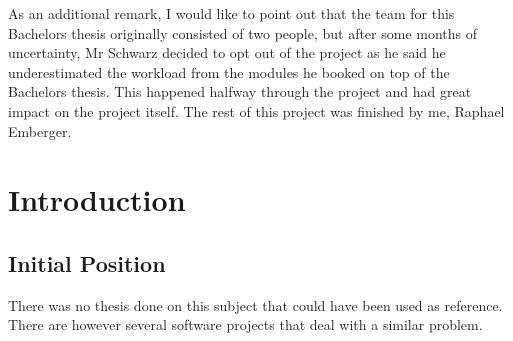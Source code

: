 \documentclass[10pt,a4paper,titlepage,twoside,english,final]{zhawreprt}
\begin{document}
As an additional remark, I would like to point out that the team for this Bachelors thesis originally consisted of two people, but after some months of uncertainty, Mr Schwarz decided to opt out of the project as he said he underestimated the workload from the modules he booked on top of the Bachelors thesis. This happened halfway through the project and had great impact on the project itself. The rest of this project was finished by me, Raphael Emberger.

\makedeclarationoforiginality

\tableofcontents

\chapter{Introduction}\label{chp:Introduction}
\section{Initial Position}\label{sec:InitialPosition}
There was no thesis done on this subject that could have been used as reference. There are however several software projects that deal with a similar problem.
\end{document}
